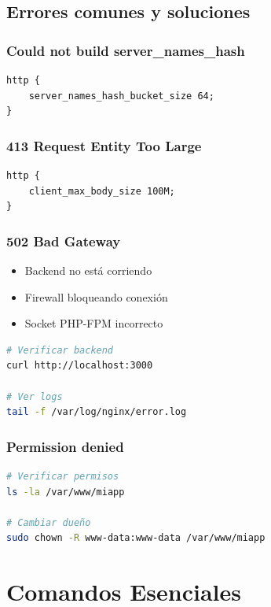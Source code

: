\documentclass[11pt,a4paper]{article}
\begin{document}
\subsection{Errores comunes y soluciones}

\subsubsection{Could not build server\_names\_hash}
\begin{lstlisting}
http {
    server_names_hash_bucket_size 64;
}
\end{lstlisting}

\subsubsection{413 Request Entity Too Large}
\begin{lstlisting}
http {
    client_max_body_size 100M;
}
\end{lstlisting}

\subsubsection{502 Bad Gateway}
\begin{itemize}
    \item Backend no está corriendo
    \item Firewall bloqueando conexión
    \item Socket PHP-FPM incorrecto
\end{itemize}

\begin{lstlisting}[language=bash]
# Verificar backend
curl http://localhost:3000

# Ver logs
tail -f /var/log/nginx/error.log
\end{lstlisting}

\subsubsection{Permission denied}
\begin{lstlisting}[language=bash]
# Verificar permisos
ls -la /var/www/miapp

# Cambiar dueño
sudo chown -R www-data:www-data /var/www/miapp
\end{lstlisting}

\section{Comandos Esenciales}
\end{document}
